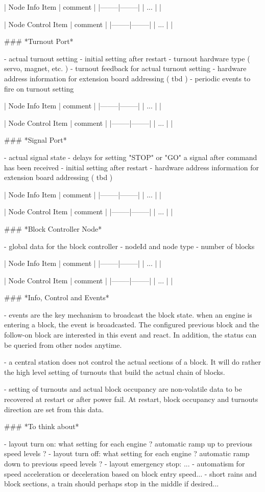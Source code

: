 | Node Info Item | comment |
|--------|--------|
| ... | |

| Node Control Item | comment |
|--------|--------|
| ... | |


### *Turnout Port*

- actual turnout setting
- initial setting after restart
- turnout hardware type ( servo, magnet, etc. )
- turnout feedback for actual turnout setting
- hardware address information for extension board addressing ( tbd )
- periodic events to fire on turnout setting

| Node Info Item | comment |
|--------|--------|
| ... | |

| Node Control Item | comment |
|--------|--------|
| ... | |

### *Signal Port*

- actual signal state
- delays for setting "STOP" or "GO" a signal after command has been received
- initial setting after restart
- hardware address information for extension board addressing ( tbd )

| Node Info Item | comment |
|--------|--------|
| ... | |

| Node Control Item | comment |
|--------|--------|
| ... | |


### *Block Controller Node*

- global data for the block controller
- nodeId and node type
- number of blocks

| Node Info Item | comment |
|--------|--------|
| ... | |

| Node Control Item | comment |
|--------|--------|
| ... | |


### *Info, Control and Events*

- events are the key mechanism to broadcast the block state. when an engine is entering a block, the event is broadcasted. The configured previous block and the follow-on block are interested in this event and react. In addition, the status can be queried from other nodes anytime.

- a central station does not control the actual sections of a block. It will do rather the high level setting of turnouts that build the actual chain of blocks.

- setting of turnouts and actual block occupancy are non-volatile data to be recovered at restart or after power fail. At restart, block occupancy and turnouts direction are set from this data.

### *To think about*

- layout turn on: what setting for each engine ? automatic ramp up to previous speed levels ?
- layout turn off: what setting for each engine ? automatic ramp down to previous speed levels ?
- layout emergency stop: ...
- automatism for speed acceleration or deceleration based on block entry speed...
- short rains and block sections, a train should perhaps stop in the middle if desired...

